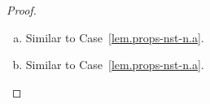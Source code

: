\begin{proof}
\begin{enumerate}[(a)]
  \item Similar to Case~\eqref{lem.props-nst-n.a}.

  \item Similar to Case~\eqref{lem.props-nst-n.a}.
  \end{enumerate}
\end{proof}

